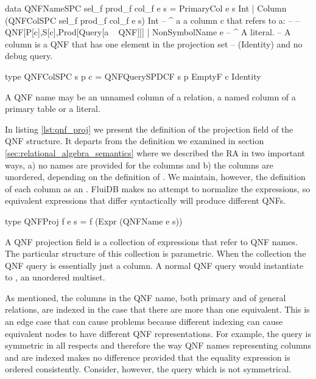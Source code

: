 \begin{code}
  \begin{haskellcode}
    data QNFNameSPC sel_f prod_f col_f e s =
      PrimaryCol e s Int
      | Column (QNFColSPC sel_f prod_f col_f e s) Int
      -- ^ a a column c that refers to a:
      --
      -- QNF[P[c],S[c],Prod[Query[a ~ QNF]]]
      | NonSymbolName e
      -- ^ A literal.
      -- A column is a QNF that has one element in the projection set
      -- (Identity) and no debug query.

    type QNFColSPC s p c = QNFQuerySPDCF s p EmptyF c Identity
  \end{haskellcode}
  \label{lst:qnf_name}
  \caption{A QNF name may be an unnamed column of a
    relation, a named column of a primary table or a literal.}
\end{code}

In listing \ref{lst:qnf_proj} we present the definition of the projection
field of the QNF structure. It departs from the definition we examined in 
section \ref{sec:relational_algebra_semantics} where we described the RA in two
important ways, a) no names are provided for the columns and b) the columns are 
unordered, depending on the definition of .
We maintain, however, the definition of each column as an . 
FluiDB makes no attempt to normalize the expressions, so equivalent
expressions that differ syntactically will produce different QNFs.

\begin{code}
  \begin{haskellcode}
    type QNFProj f e s = f (Expr (QNFName e s))
  \end{haskellcode}
  \caption{\label{lst:qnf_proj}A QNF projection field is a collection of
    expressions that refer to QNF names. The particular structure of
    this collection is parametric. When the collection 
    the QNF query is essentially just a column. A normal QNF query
    would instantiate  to , an unordered
    multiset.}
\end{code}

As mentioned, the columns in the QNF name, both primary and of general
relations, are indexed in the case that there are more than one
equivalent. This is an edge case that can cause problems because
different indexing can cause equivalent nodes to have different
QNF representations. For example, the query  is symmetric in all respects and therefore the way 
QNF names  representing columns  and  are indexed makes no difference
provided that the equality expression  is ordered consistently.
Consider, however, the query  
which is not symmetrical. 

